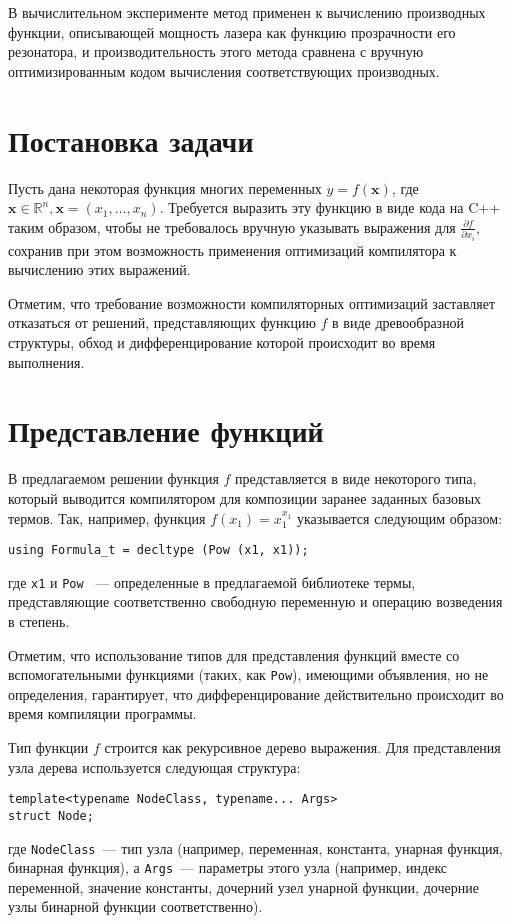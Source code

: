 \documentclass[11pt,a4paper]{article}
\begin{document}
В вычислительном эксперименте метод применен к вычислению производных функции,
описывающей мощность лазера как функцию прозрачности его резонатора, и производительность
этого метода сравнена с вручную оптимизированным кодом вычисления соответствующих
производных.

\section{Постановка задачи}

Пусть дана некоторая функция многих переменных $y = f(\boldsymbol{x})$, где
$\boldsymbol{x} \in \mathbb{R}^n, \boldsymbol{x} = (x_1, \dots, x_n)$. Требуется
выразить эту функцию в виде кода на C++ таким образом, чтобы не требовалось вручную
указывать выражения для $\frac{\partial f}{\partial x_i}$, сохранив при этом возможность
применения оптимизаций компилятора к вычислению этих выражений.

Отметим, что требование возможности компиляторных оптимизаций заставляет отказаться
от решений, представляющих функцию $f$ в виде древообразной структуры, обход и дифференцирование
которой происходит во время выполнения.

\section{Представление функций}

В предлагаемом решении функция $f$ представляется в виде некоторого типа, который
выводится компилятором для композиции заранее заданных базовых термов. Так, например,
функция $f(x_1) = x_1^{x_1}$ указывается следующим образом:
\begin{lstlisting}
using Formula_t = decltype (Pow (x1, x1));
\end{lstlisting}
где \texttt{x1} и \texttt{Pow} ~--- определенные в предлагаемой библиотеке термы,
представляющие соответственно свободную переменную и операцию возведения в степень.

Отметим, что использование типов для представления функций вместе со вспомогательными
функциями (таких, как \texttt{Pow}), имеющими объявления, но не определения,
гарантирует, что дифференцирование действительно происходит во время компиляции программы.

Тип функции $f$ строится как рекурсивное дерево выражения. Для представления узла
дерева используется следующая структура:
\begin{lstlisting}
template<typename NodeClass, typename... Args>
struct Node;
\end{lstlisting}
где \texttt{NodeClass}~--- тип узла (например, переменная, константа, унарная функция,
бинарная функция), а \texttt{Args}~--- параметры этого узла (например, индекс переменной,
значение константы, дочерний узел унарной функции, дочерние узлы бинарной функции
соответственно).
\end{document}
